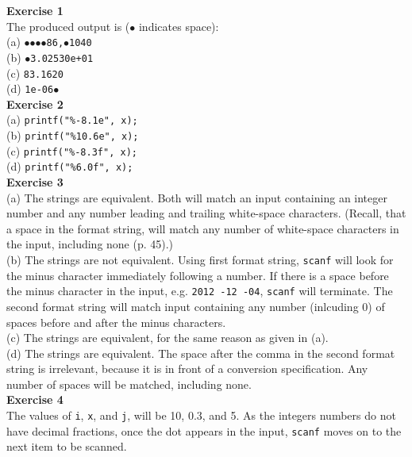 \documentclass[a4paper, 10pt]{article}
\begin{document}
\textbf{Exercise 1} \\
The produced output is ($\bullet$ indicates space): \\
(a) \texttt{$\bullet$$\bullet$$\bullet$$\bullet$86,$\bullet$1040} \\
(b) \texttt{$\bullet$3.02530e+01} \\
(c) \texttt{83.1620} \\
(d) \texttt{1e-06$\bullet$} \\

\textbf{Exercise 2} \\
(a) \lstinline!printf("%-8.1e", x);! \\
(b) \lstinline!printf("%10.6e", x);! \\
(c) \lstinline!printf("%-8.3f", x);! \\
(d) \lstinline!printf("%6.0f", x);! \\

\textbf{Exercise 3} \\
(a) The strings are equivalent. Both will match an input containing an integer number and any number leading and trailing white-space characters. (Recall, that a space in the format string, will match any number of white-space characters in the input, including none (p. 45).) \\

(b) The strings are not equivalent. Using first format string, \texttt{scanf} will look for the minus character immediately following a number. If there is a space before the minus character in the input, e.g. \texttt{2012 -12 -04}, \texttt{scanf} will terminate. The second format string will match input containing any number (inlcuding 0) of spaces before and after the minus characters. \\ 

(c) The strings are equivalent, for the same reason as given in (a). \\

(d) The strings are equivalent. The space after the comma in the second format string is irrelevant, because it is in front of a conversion specification. Any number of spaces will be matched, including none. \\

\textbf{Exercise 4} \\
The values of \texttt{i}, \texttt{x}, and \texttt{j}, will be 10, 0.3, and 5. As the integers numbers do not have decimal fractions, once the dot appears in the input, \texttt{scanf}  moves on to the next item to be scanned.\\
\end{document}
